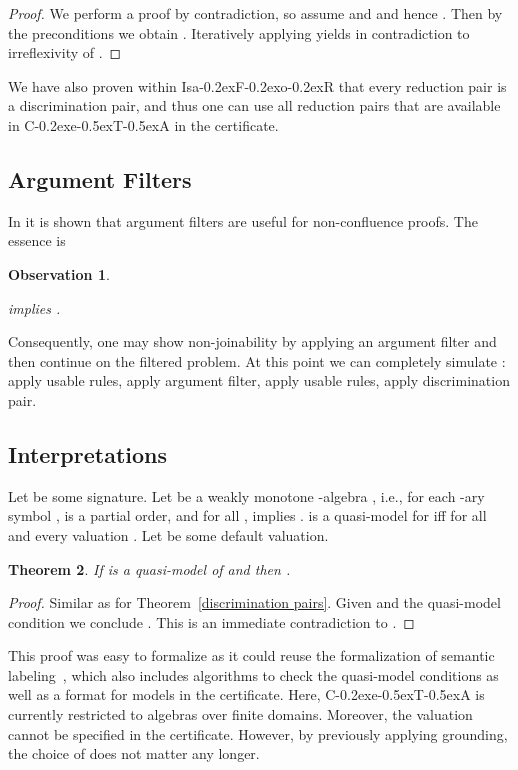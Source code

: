 \documentclass[a4paper]{easychair}
\newtheorem{theorem}{Theorem}
\newtheorem{observation}[theorem]{Observation}
\newcommand\isafor{\textsf{Isa\kern-0.2exF\kern-0.2exo\kern-0.2exR}\xspace}
\newcommand\ceta{\textsf{C\kern-0.2exe\kern-0.5exT\kern-0.5exA}\xspace}
\newcommand\rTH[1]{Theorem~\ref{#1}}
\begin{document}
\begin{proof}
We perform a proof by contradiction, so 
assume  and  and hence .
Then by the preconditions
we obtain .
Iteratively applying  yields  
in contradiction to irreflexivity of .
\end{proof}

We have also proven within \isafor that every reduction pair is a discrimination pair, and
thus one can use all reduction pairs that are available in \ceta in the certificate.

\subsection{Argument Filters}
In \cite{Aoto} it is shown that argument filters  are useful for non-confluence
proofs. The essence is

\begin{observation}
\label{argument filter}
 
implies .
\end{observation}

Consequently, one may show non-joinability by applying an argument filter
and then continue on the filtered problem.
At this point we can completely simulate \cite[Theorem 14]{Aoto}:
apply usable rules, apply argument filter, apply usable rules, apply discrimination pair.

\subsection{Interpretations}
Let  be some signature. Let  be a weakly monotone -algebra , i.e.,
 for each -ary symbol ,  is a partial order, \pagebreak
and for all ,  implies .
 is a quasi-model for  iff 
for all  and every valuation .
Let  be some default valuation.

\begin{theorem}
\label{quasi}
If  is a quasi-model of  and  then
.
\end{theorem}

\begin{proof}
Similar as for \rTH{discrimination pairs}. Given 
and the quasi-model condition we conclude . 
This is an immediate contradiction to 
.
\end{proof}

This proof was easy to formalize as it could reuse the formalization of semantic labeling~\cite{CSRT-RTA11},
which also includes algorithms to check the quasi-model conditions as well as 
a format for models in the certificate.
Here, \ceta is currently restricted to algebras over finite domains.
Moreover, the valuation  cannot be specified in the certificate. However,
by previously applying grounding, the choice of  does not matter any longer.
\end{document}
